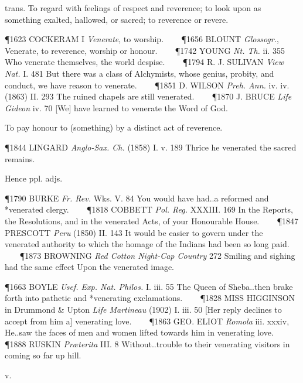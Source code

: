 \begin{description}[wide, labelwidth=!, labelindent=0pt]
\begin{myenumerate}
 trans. To regard with feelings of respect and reverence; to look upon as something exalted, hallowed, or sacred; to reverence or revere.

\P 1623 COCKERAM I \textit{Venerate}, to worship.    
\P 1656 BLOUNT  \textit{Glossogr.}, Venerate, to reverence, worship or honour.    
\P 1742 YOUNG  \textit{Nt. Th.} ii. 355 Who venerate themselves, the world despise.    
\P 1794 R. J. SULIVAN  \textit{View Nat.} I. 481 But there was a class of Alchymists, whose genius, probity, and conduct, we have reason to venerate.    
\P 1851 D. WILSON  \textit{Preh. Ann.} iv. iv. (1863) II. 293 The ruined chapels are still venerated.    
\P 1870 J. BRUCE  \textit{Life Gideon} iv. 70 [We] have learned to venerate the Word of God.

 To pay honour to (something) by a distinct act of reverence.

\P 1844 LINGARD  \textit{Anglo-Sax. Ch.} (1858) I. v. 189 Thrice he venerated the sacred remains.

\noindent Hence  ppl. adjs.

\P 1790 BURKE  \textit{Fr. Rev.} Wks. V. 84 You would have had..a reformed and *venerated clergy.    
\P 1818 COBBETT  \textit{Pol. Reg.} XXXIII. 169 In the Reports, the Resolutions, and in the venerated Acts, of your Honourable House.    
\P 1847 PRESCOTT  \textit{Peru} (1850) II. 143 It would be easier to govern under the venerated authority to which the homage of the Indians had been so long paid.    
\P 1873 BROWNING  \textit{Red Cotton Night-Cap Country} 272 Smiling and sighing had the same effect Upon the venerated image.

\P 1663 BOYLE  \textit{Usef. Exp. Nat. Philos.} I. iii. 55 The Queen of Sheba..then brake forth into pathetic and *venerating exclamations.    
\P 1828 MISS HIGGINSON in  Drummond \& Upton \textit{Life Martineau} (1902) I. iii. 50 [Her reply declines to accept from him a] venerating love.    
\P 1863 GEO. ELIOT  \textit{Romola} iii. xxxiv, He..saw the faces of men and women lifted towards him in venerating love.    
\P 1888 RUSKIN  \textit{Præterita} III. 8 Without..trouble to their venerating visitors in coming so far up hill.
\end{myenumerate}


 v.

\noindent {}

\vspace{-0.3cm}


\end{description}
